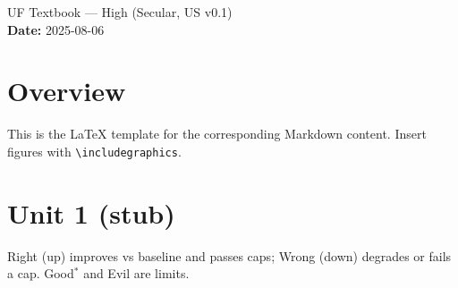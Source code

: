 \documentclass[11pt]{article}
\begin{document}
\begin{center}
{\LARGE UF Textbook — High (Secular, US v0.1) }\\[6pt]
\textbf{Date: }2025-08-06
\end{center}

\section*{Overview}
This is the LaTeX template for the corresponding Markdown content. Insert figures with \texttt{\textbackslash includegraphics}.

\section*{Unit 1 (stub)}
Right (up) improves vs baseline and passes caps; Wrong (down) degrades or fails a cap. Good$^\ast$ and Evil are limits.
\end{document}
